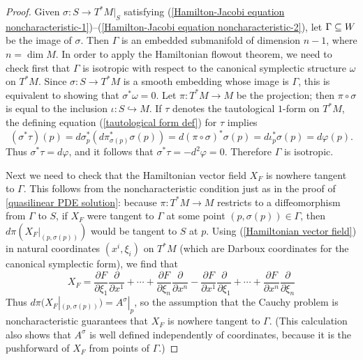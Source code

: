 \begin{proof}
Given $\sigma:S\to T^*M|_S$ satisfying (\ref{Hamilton-Jacobi equation noncharacteristic-1})--(\ref{Hamilton-Jacobi equation noncharacteristic-2}), let $\Gamma\subseteq W$ be the image of $\sigma$. Then $\Gamma$ is an embedded submanifold of dimension $n-1$, where $n=\dim M$. In order to apply the Hamiltonian flowout theorem, we need to check first that $\Gamma$ is isotropic with respect to the canonical symplectic structure $\omega$ on $T^*M$. Since $\sigma:S\to T^*M$ is a smooth embedding whose image is $\Gamma$, this is equivalent to showing that $\sigma^*\omega=0$. Let $\pi:T^*M\to M$ be the projection; then $\pi\circ\sigma$ is equal to the inclusion $\iota:S\hookrightarrow M$. If $\tau$ denotes the tautological $1$-form on $T^*M$, the defining equation (\ref{tautological form def}) for $\tau$ implies
\[(\sigma^*\tau)(p)=d\sigma_p^*(d\pi_{\sigma(p)}^*\sigma(p))=d(\pi\circ\sigma)^*\sigma(p)=d\iota_p^*\sigma(p)=d\varphi(p).\]
Thus $\sigma^*\tau=d\varphi$, and it follows that $\sigma^*\tau=-d^2\varphi=0$. Therefore $\Gamma$ is isotropic.\par
Next we need to check that the Hamiltonian vector field $X_F$ is nowhere tangent to $\Gamma$. This follows from the noncharacteristic condition just as in the proof of \cref{quasilinear PDE solution}: because $\pi:T^*M\to M$ restricts to a diffeomorphism from $\Gamma$ to $S$, if $X_F$ were tangent to $\Gamma$ at some point $(p,\sigma(p))\in\Gamma$, then $d\pi(X_F|_{(p,\sigma(p))})$ would be tangent to $S$ at $p$. Using (\ref{Hamiltonian vector field}) in natural coordinates $(x^i,\xi_i)$ on $T^*M$ (which are Darboux coordinates for the canonical symplectic form), we find that
\[X_F=\frac{\partial F}{\partial\xi_1}\frac{\partial}{\partial x^1}+\cdots+\frac{\partial F}{\partial\xi_n}\frac{\partial}{\partial x^n}-\frac{\partial F}{\partial x^1}\frac{\partial}{\partial \xi_1}+\cdots+\frac{\partial F}{\partial x^n}\frac{\partial}{\partial\xi_n}\]
Thus $d\pi(X_F|_{(p,\sigma(p))})=A^\sigma|_p$, so the assumption that the Cauchy problem is noncharacteristic guarantees that $X_F$ is nowhere tangent to $\Gamma$. (This calculation also shows that $A^\sigma$ is well defined independently of coordinates, because it is the pushforward of $X_F$ from points of $\Gamma$.)\par

\end{proof}
